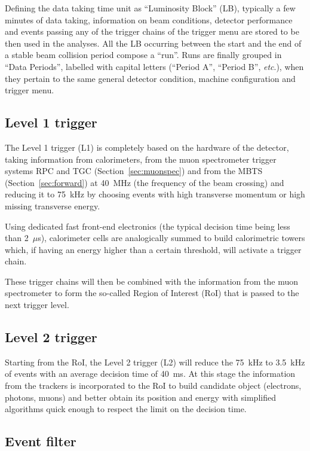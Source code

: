 Defining the data taking time unit as ``Luminosity Block'' (LB), typically
a few minutes of  data taking, information on beam conditions, detector performance 
and events passing any of the trigger chains of the trigger menu are stored
to be then used in the analyses. All the LB occurring between the start and the
end of a stable beam collision period compose a ``run''. Runs are finally grouped
in ``Data Periods'', labelled with capital letters (``Period A'', ``Period B'', {\it etc}.),
when they pertain to the same general detector condition, machine configuration and
trigger menu.




\subsection{Level 1 trigger}\label{sec:lvl1}

The Level 1 trigger (L1) is completely based on the hardware of the detector,
taking information from calorimeters, from the muon spectrometer trigger
systems RPC and TGC (Section~\ref{sec:muonspec}) and from the MBTS (Section~\ref{sec:forward}) 
at 40~MHz (the frequency of the beam crossing) and reducing it to 75~kHz by choosing events with high
transverse momentum or high missing transverse energy.

Using dedicated fast front-end electronics (the typical decision time being less than
2~$\mu$s), calorimeter cells are analogically 
summed to build calorimetric towers which, if having an energy higher than a 
certain threshold, will activate a trigger chain.

These trigger chains will then be combined with the information from the
muon spectrometer to form the so-called Region of Interest (RoI) that is
passed to the next trigger level.


\subsection{Level 2 trigger}\label{sec:lvl2}

Starting from the RoI, the Level 2 trigger (L2) will reduce the 75~kHz to
3.5~kHz of events with an average decision time of 40~ms. At this
stage the information from the trackers is incorporated to the RoI
to build candidate object (electrons, photons, muons) and 
better obtain its position and energy with simplified algorithms
quick enough to respect the limit on the decision time.

\subsection{Event filter}\label{sec:lvl3}

